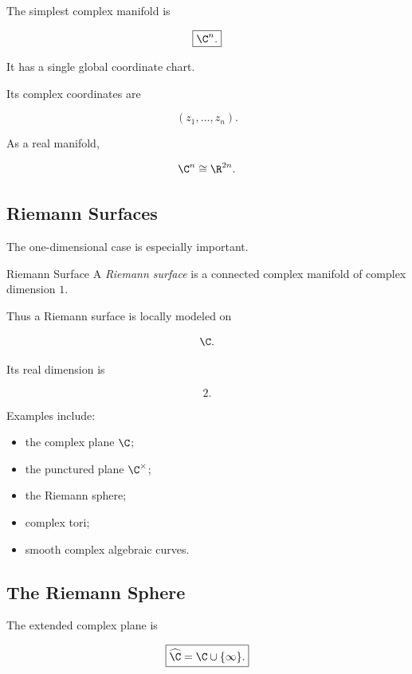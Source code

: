 The simplest complex manifold is

\[
\boxed{\C^n.}
\]

It has a single global coordinate chart.

Its complex coordinates are

\[
(z_1,\ldots,z_n).
\]

As a real manifold,

\[
\C^n\cong\R^{2n}.
\]

\subsection{Riemann Surfaces}
\label{subsec:riemann-surfaces}

The one-dimensional case is especially important.

\begin{definitionbox}{Riemann Surface}
A \emph{Riemann surface} is a connected complex manifold of complex
dimension \(1\).
\end{definitionbox}

Thus a Riemann surface is locally modeled on

\[
\C.
\]

Its real dimension is

\[
2.
\]

Examples include:

\begin{itemize}
    \item the complex plane \(\C\);
    \item the punctured plane \(\C^\times\);
    \item the Riemann sphere;
    \item complex tori;
    \item smooth complex algebraic curves.
\end{itemize}

\subsection{The Riemann Sphere}
\label{subsec:riemann-sphere}

The extended complex plane is

\[
\boxed{
\widehat{\C}
=
\C\cup\{\infty\}.
}
\]


